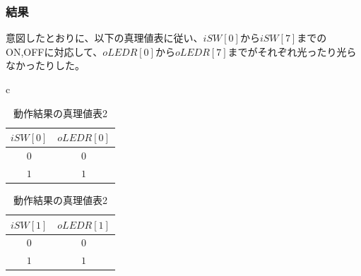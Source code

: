 \documentclass[a4paper]{jarticle}
\begin{document}
\subsubsection{結果}
意図したとおりに、以下の真理値表に従い、$iSW[0]$から$iSW[7]$までのON,OFFに対応して、$oLEDR[0]$から$oLEDR[7]$までがそれぞれ光ったり光らなかったりした。
\begin{table}[H]
	\begin{center}
		\begin{tabular}{c}
			\begin{minipage}{0.5\hsize}
				\begin{center}
					\caption{動作結果の真理値表1}
					\label{Work1TruthTable1}
					\begin{tabular}{|c|c|}
						\hline
						$iSW[0]$	&$oLEDR[0]$\\	\hline\hline
						$0$		&$0$\\		\hline
						$1$		&$1$\\		\hline
					\end{tabular}
				\end{center}
			\end{minipage}
			\begin{minipage}{0.5\hsize}
				\begin{center}
					\caption{動作結果の真理値表2}
					\label{Work1TruthTable2}
					\begin{tabular}{|c|c|}
						\hline
						$iSW[1]$	&$oLEDR[1]$\\	\hline\hline
						$0$		&$0$\\		\hline
						$1$		&$1$\\		\hline
					\end{tabular}
				\end{center}
			\end{minipage}
		\end{tabular}
	\end{center}
\end{table}
\end{document}
